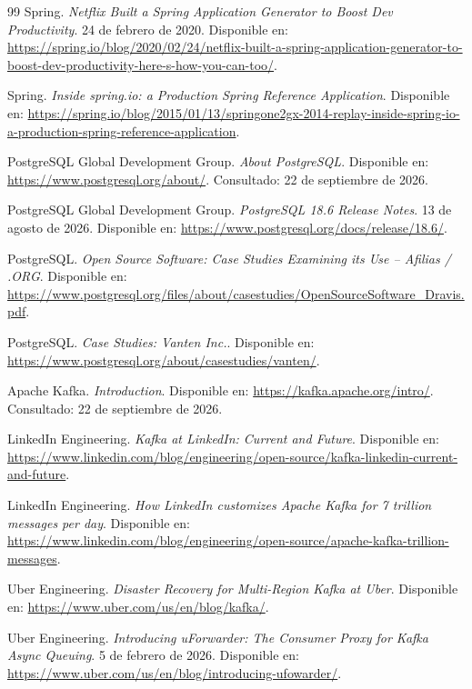 \documentclass[12pt,a4paper]{article}
\begin{document}
\begin{thebibliography}{99}
Spring. \textit{Netflix Built a Spring Application Generator to Boost Dev Productivity}. 24 de febrero de 2020. Disponible en: \url{https://spring.io/blog/2020/02/24/netflix-built-a-spring-application-generator-to-boost-dev-productivity-here-s-how-you-can-too/}.

Spring. \textit{Inside spring.io: a Production Spring Reference Application}. Disponible en: \url{https://spring.io/blog/2015/01/13/springone2gx-2014-replay-inside-spring-io-a-production-spring-reference-application}.

PostgreSQL Global Development Group. \textit{About PostgreSQL}. Disponible en: \url{https://www.postgresql.org/about/}. Consultado: 22 de septiembre de 2026.

PostgreSQL Global Development Group. \textit{PostgreSQL 18.6 Release Notes}. 13 de agosto de 2026. Disponible en: \url{https://www.postgresql.org/docs/release/18.6/}.

PostgreSQL. \textit{Open Source Software: Case Studies Examining its Use -- Afilias / .ORG}. Disponible en: \url{https://www.postgresql.org/files/about/casestudies/OpenSourceSoftware_Dravis.pdf}.

PostgreSQL. \textit{Case Studies: Vanten Inc.}. Disponible en: \url{https://www.postgresql.org/about/casestudies/vanten/}.

Apache Kafka. \textit{Introduction}. Disponible en: \url{https://kafka.apache.org/intro/}. Consultado: 22 de septiembre de 2026.

LinkedIn Engineering. \textit{Kafka at LinkedIn: Current and Future}. Disponible en: \url{https://www.linkedin.com/blog/engineering/open-source/kafka-linkedin-current-and-future}.

LinkedIn Engineering. \textit{How LinkedIn customizes Apache Kafka for 7 trillion messages per day}. Disponible en: \url{https://www.linkedin.com/blog/engineering/open-source/apache-kafka-trillion-messages}.

Uber Engineering. \textit{Disaster Recovery for Multi-Region Kafka at Uber}. Disponible en: \url{https://www.uber.com/us/en/blog/kafka/}.

Uber Engineering. \textit{Introducing uForwarder: The Consumer Proxy for Kafka Async Queuing}. 5 de febrero de 2026. Disponible en: \url{https://www.uber.com/us/en/blog/introducing-ufowarder/}.


\end{thebibliography}
\end{document}
